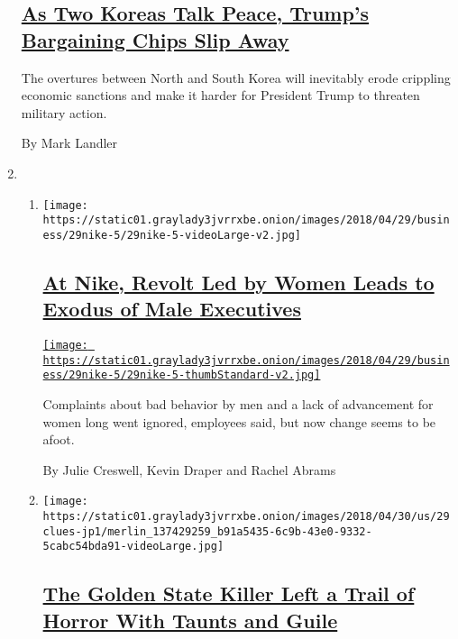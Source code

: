 \begin{enumerate}
  \hypertarget{as-two-koreas-talk-peace-trumps-bargaining-chips-slip-away}{%
  \subsection{\texorpdfstring{\href{/2018/04/28/us/politics/trump-north-korea.html}{As
  Two Koreas Talk Peace, Trump's Bargaining Chips Slip
  Away}}{As Two Koreas Talk Peace, Trump's Bargaining Chips Slip Away}}\label{as-two-koreas-talk-peace-trumps-bargaining-chips-slip-away}}

  The overtures between North and South Korea will inevitably erode
  crippling economic sanctions and make it harder for President Trump to
  threaten military action.

  By Mark Landler
\item
  \begin{enumerate}
  \def\labelenumii{\arabic{enumii}.}
  \item
    \texttt{[image: https://static01.graylady3jvrrxbe.onion/images/2018/04/29/business/29nike-5/29nike-5-videoLarge-v2.jpg]}

    \hypertarget{at-nike-revolt-led-by-women-leads-to-exodus-of-male-executives}{%
    \subsection{\texorpdfstring{\href{/2018/04/28/business/nike-women.html}{At
    Nike, Revolt Led by Women Leads to Exodus of Male
    Executives}}{At Nike, Revolt Led by Women Leads to Exodus of Male Executives}}\label{at-nike-revolt-led-by-women-leads-to-exodus-of-male-executives}}

    \href{/2018/04/28/business/nike-women.html}{\texttt{[image: https://static01.graylady3jvrrxbe.onion/images/2018/04/29/business/29nike-5/29nike-5-thumbStandard-v2.jpg]}}

    Complaints about bad behavior by men and a lack of advancement for
    women long went ignored, employees said, but now change seems to be
    afoot.

    By Julie Creswell, Kevin Draper and Rachel Abrams
  \item
    \texttt{[image: https://static01.graylady3jvrrxbe.onion/images/2018/04/30/us/29clues-jp1/merlin\_137429259\_b91a5435-6c9b-43e0-9332-5cabc54bda91-videoLarge.jpg]}

    \hypertarget{the-golden-state-killer-left-a-trail-of-horror-with-taunts-and-guile}{%
    \subsection{\texorpdfstring{\href{/2018/04/28/us/golden-state-killer-joseph-deangelo.html}{The
    Golden State Killer Left a Trail of Horror With Taunts and
    Guile}}{The Golden State Killer Left a Trail of Horror With Taunts and Guile}}\label{the-golden-state-killer-left-a-trail-of-horror-with-taunts-and-guile}}


\end{enumerate}
\end{enumerate}
